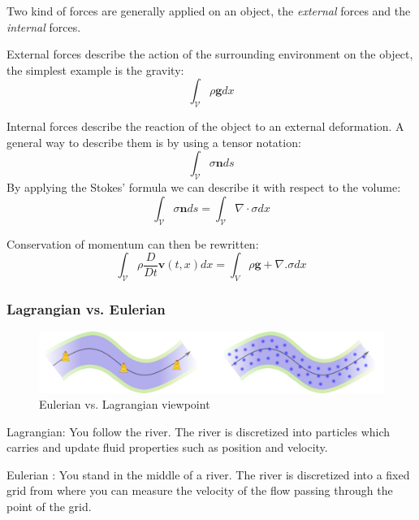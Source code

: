 \documentclass[11pt, oneside, a4paper]{memoir}
\begin{document}
Two kind of forces are generally applied on an object, the \emph{external} forces and the \emph{internal} forces.

External forces describe the action of the surrounding environment on the object, the simplest example is the gravity:
\begin{equation}
\int_{\mathcal{V}} \rho \mathbf{g} dx
\end{equation}

Internal forces describe the reaction of the object to an external deformation. A general way to describe them is by using a tensor notation:
\begin{equation}
\int_{\mathcal{V}} \sigma \mathbf{n} ds
\end{equation}
By applying the Stokes' formula we can describe it with respect to the volume:
\begin{equation}
\int_{\mathcal{V}} \sigma \mathbf{n} ds =
\int_{\mathcal{V}} \nabla \cdot \sigma dx
\end{equation}

Conservation of momentum can then be rewritten:
\begin{equation}
\int_{\mathcal{V}} \rho \frac{D}{Dt} \mathbf{v}(t,x) dx = \int_{V} \rho \mathbf{g} + \nabla. \sigma dx
\end{equation}

\subsubsection{Lagrangian vs. Eulerian}

\begin{figure}[!ht]
\centering
\includegraphics[scale=0.5]{images/continuum_mechanics/eulerianVsLagrangian.png}
\caption{\label{fig:eulerianVsLagrangian} Eulerian vs. Lagrangian viewpoint}
\end{figure}

Lagrangian: You follow the river. The river is discretized into particles which carries and update fluid properties such as position and velocity. 

Eulerian : You stand in the middle of a river. The river is discretized into a fixed grid from where you can measure the velocity of the flow passing through the point of the grid.
\end{document}
